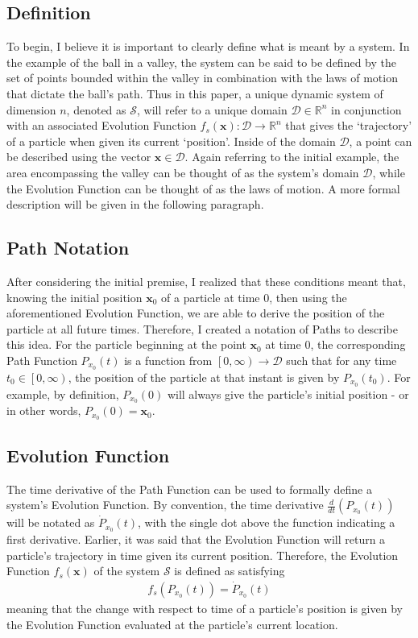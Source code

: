 \documentclass{article}
\newcommand{\B}[1]{\boldsymbol{#1}}
\theoremstyle{definition}
\theoremstyle{remark}
\begin{document}
\subsection{Definition}
  To begin, I believe it is important to clearly define what is meant by a system. In the example of 
the ball in a valley, the system can be said to be defined by the set of points bounded within the valley
in combination with the laws of motion that dictate the ball's path. Thus in this paper, 
a unique dynamic system of dimension $n$, denoted as $\mathcal{S}$,
will refer to a unique domain $\mathcal{D} \in \mathbb{R}^n$ in conjunction with an associated 
Evolution Function $f_s(\B{x}) : \mathcal{D} \to \mathbb{R}^n$ that gives the `trajectory' of a particle 
when given its current `position'. Inside of the domain $\mathcal{D}$, a point can be described using the vector $\B{x} \in \mathcal{D}$. 
Again referring to the initial example, the area encompassing the valley
can be thought of as the system's domain $\mathcal{D}$, while the Evolution Function can be thought of as the
laws of motion. A more formal description will be given in the following paragraph. 

\subsection{Path Notation}

After considering the initial premise, I realized that these conditions meant that, knowing 
the initial position $\B{x}_0$ of a particle at time 0, then using the aforementioned Evolution Function,
we are able to derive the position of the particle at all future times. Therefore, I created a notation 
of Paths to describe this idea. For the particle beginning at the point $\B{x}_0$ at time 0, the corresponding 
Path Function $P_{x_0}(t)$ is a function from $\left[0, \infty \right) \to \mathcal{D}$ such that for any time 
$t_0 \in \left[0, \infty \right)$, the position of the particle at that instant is given by $P_{x_0}(t_0)$. For example,
by definition, $P_{x_0}(0)$ will always give the particle's initial position - or in other words, $P_{x_0}(0) = \B{x}_0$.

\subsection{Evolution Function}

The time derivative of the Path Function can be used to formally define a system's Evolution Function. 
By convention, the time derivative $\frac{d}{dt} \left(P_{x_0}(t)\right)$ will be notated as $\dot{P}_{x_0}(t)$, 
with the single dot above the function indicating a first derivative. Earlier, it was said that
the Evolution Function will return a particle's trajectory in time given its current position. Therefore,
the Evolution Function $f_s(\B{x})$ of the system $\mathcal{S}$ is defined as satisfying 
\begin{align}
  f_s(P_{x_0}(t)) = \dot{P}_{x_0}(t) \label{eq:System Equation} 
\end{align}
meaning that the change with respect to time of a particle's position is given by the Evolution Function evaluated at the 
particle's current location.
\end{document}
